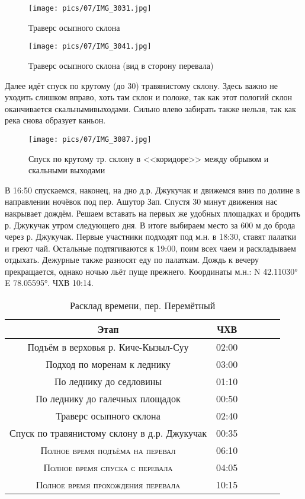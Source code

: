 \begin{figure}[h!]
	\centering
	\texttt{[image: pics/07/IMG\_3031.jpg]}
	\caption{Траверс осыпного склона}
	\label{fig:IMG_3031.jpg}
\end{figure}

\begin{figure}[h!]
	\centering
	\texttt{[image: pics/07/IMG\_3041.jpg]}
	\caption{Траверс осыпного склона (вид в сторону перевала)}
	\label{fig:IMG_3041.jpg}
\end{figure}

Далее идёт спуск по крутому (до 30\degree) травянистому склону. Здесь важно не уходить слишком вправо, хоть там склон и положе, так как этот пологий склон оканчивается скальнымивыходами. Сильно влево забирать также нельзя, так как река снова образует каньон.

\begin{figure}[h!]
	\centering	\texttt{[image: pics/07/IMG\_3087.jpg]}
	\caption{Спуск по крутому тр. склону в <<коридоре>> между обрывом и скальными  выходами}
	\label{fig:IMG_3087.jpg}
\end{figure}


В 16:50 спускаемся, наконец, на дно д.р. Джукучак и движемся вниз по долине в направлении ночёвок под пер. Ашутор Зап. Спустя 30 минут движения нас накрывает дождём. Решаем вставать на первых же удобных площадках и бродить р. Джукучак утром следующего дня. В итоге выбираем место за 600 м до брода через р. Джукучак. Первые участники подходят под м.н. в 18:30, ставят палатки и греют чай. Остальные подтягиваются к 19:00, поим всех чаем и раскладываем отдыхать. Дежурные также разносят еду по палаткам. Дождь к вечеру прекращается, однако ночью льёт пуще прежнего.
Координаты м.н.: N 42.11030° E 78.05595°. ЧХВ 10:14.

\begin{table}[h!]
	\centering
	\begin{tabular}{|c|c|c|c|c|c|} 
		\hline 
		Этап & ЧХВ \\ 	
		\hline 
		Подъём в верховья р. Киче-Кызыл-Суу  & 02:00 \\
		Подход по моренам к леднику  & 03:00 \\
		По леднику до седловины & 01:10\\ 
		По леднику до галечных площадок & 00:50\\ 
		Траверс осыпного склона & 02:40\\ 
		Спуск по травянистому склону в д.р. Джукучак & 00:35 \\
		\hline
		\textsc{Полное время подъёма на перевал  }& 06:10\\
		\textsc{Полное время спуска с перевала }& 04:05 \\
		\textsc{	Полное время прохождения перевала }& 10:15 \\
		\hline
	\end{tabular}
	\caption{Расклад времени, пер. Перемётный}
\end{table}



